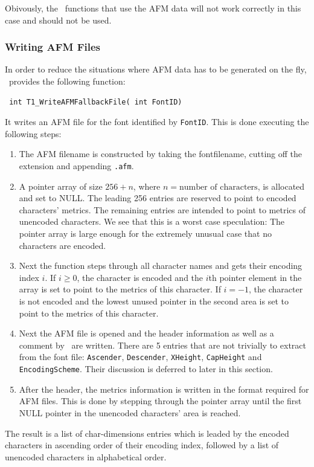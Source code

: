 Obivously, the \tonelib\ functions that use
the AFM data will not work correctly in this case and should not be
used.

\subsubsection{Writing AFM Files}
\label{writingafmfiles}%
In order to reduce the situations where AFM data has to be generated on the
fly, \tonelib\ provides the following function:
\precorr
\begin{verbatim}
 int T1_WriteAFMFallbackFile( int FontID)
\end{verbatim}\postcorr
It writes an AFM file for the font identified by \verb+FontID+. This is done
executing the following steps:
\begin{enumerate}
\item The AFM filename is constructed by taking the fontfilename, cutting off
  the extension and appending \verb+.afm+.
\item A pointer array of size $256 + n$, where $n=\mbox{number of
  characters}$, is
  allocated and set to NULL. The leading 256 entries are reserved to point to 
  encoded
  characters' metrics. The remaining entries are intended to point to metrics
  of unencoded characters. We see that this is a worst case speculation: The
  pointer array is large enough for the extremely unusual case that no
  characters are encoded. 
\item Next the function steps through all character names and gets their
  encoding index $i$. If $i\geq0$, the character is encoded and the $i$th
  pointer element in the array is set to point to the metrics of this
  character. If $i=-1$, the character is not encoded and the lowest unused
  pointer in the second area is set to point to the metrics of this character.
\item Next the AFM file is opened and the header information as well as a
  comment by \tonelib\ are written. There are 5 entries that are not trivially
  to extract from the font file: \verb+Ascender+, \verb+Descender+,
  \verb+XHeight+, \verb+CapHeight+ and \verb+EncodingScheme+. Their
  discussion is deferred to later in this section.
\item After the header, the metrics information is written in the format
  required for AFM files. This is done by stepping through the pointer array
  until the first NULL pointer in the unencoded characters' area is
  reached. 
\end{enumerate}
The result is a list of char-dimensions entries which is leaded by the encoded
characters in ascending order of their encoding index, followed by a list of
unencoded characters in alphabetical order. 

